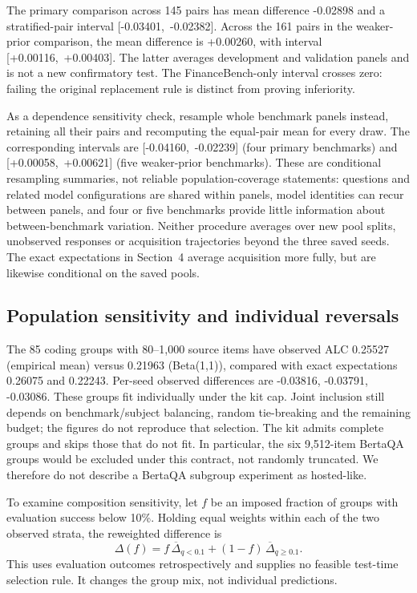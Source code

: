 \documentclass{article}
\begin{document}
The primary comparison across 145 pairs has mean difference -0.02898
and a stratified-pair interval \mbox{[-0.03401, -0.02382]}. Across the 161 pairs in the weaker-prior
comparison, the mean difference is +0.00260, with interval \mbox{[+0.00116, +0.00403]}.
The latter averages development and validation panels and is not a new
confirmatory test. The FinanceBench-only interval crosses zero: failing
the original replacement rule is distinct from proving inferiority.

As a dependence sensitivity check, resample whole benchmark panels instead,
retaining all their pairs and recomputing the equal-pair mean for every draw.
The corresponding intervals are \mbox{[-0.04160, -0.02239]} (four primary benchmarks)
and \mbox{[+0.00058, +0.00621]} (five weaker-prior benchmarks). These are conditional
resampling summaries, not reliable population-coverage statements: questions
and related model configurations are shared within panels, model identities can
recur between panels, and four or five benchmarks provide little information
about between-benchmark variation. Neither procedure averages over new pool
splits, unobserved responses or acquisition trajectories beyond the three saved
seeds. The exact expectations in Section~4 average acquisition more fully,
but are likewise conditional on the saved pools.

\clearpage
\subsection{Population sensitivity and individual reversals}
The 85 coding groups with 80--1,000 source items have observed ALC 0.25527
(empirical mean) versus 0.21963 (Beta(1,1)), compared with exact expectations
0.26075 and 0.22243. Per-seed observed differences are -0.03816, -0.03791, -0.03086.
These groups fit individually under the kit cap. Joint inclusion still depends
on benchmark/subject balancing, random tie-breaking and the remaining budget;
the figures do not reproduce that selection. The kit admits complete groups
and skips those that do not fit. In particular, the six 9,512-item BertaQA
groups would be excluded under this contract, not randomly truncated.
We therefore do not describe a BertaQA subgroup experiment as hosted-like.

To examine composition sensitivity, let $f$ be an imposed fraction of groups
with evaluation success below 10\%. Holding equal weights within each of the
two observed strata, the reweighted difference is
\begin{equation}
\Delta(f)=f\,\overline\Delta_{q<0.1}+(1-f)\,\overline\Delta_{q\geq0.1}.
\end{equation}
This uses evaluation outcomes retrospectively and supplies no feasible
test-time selection rule. It changes the group mix, not individual predictions.
\end{document}
